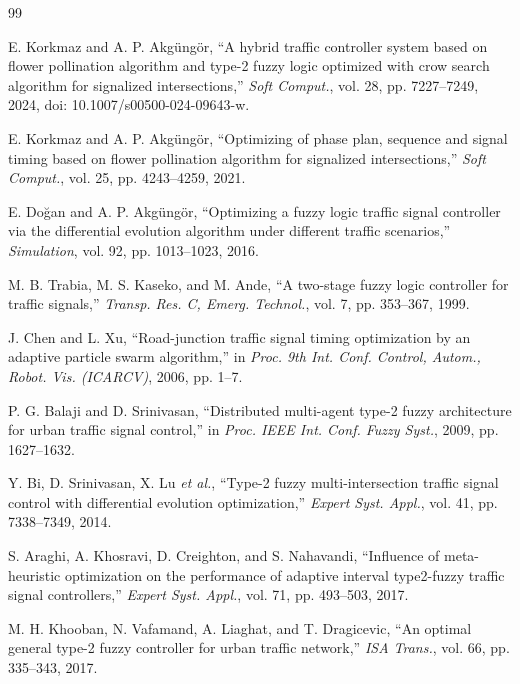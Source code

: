 \begin{thebibliography}{99}\small\raggedright\sloppy

 E. Korkmaz and A. P. Akg{\"u}ng{\"o}r, ``A hybrid traffic controller system based on flower pollination algorithm and type-2 fuzzy logic optimized with crow search algorithm for signalized intersections,'' \emph{Soft Comput.}, vol. 28, pp. 7227--7249, 2024, doi: 10.1007/s00500-024-09643-w.

 E. Korkmaz and A. P. Akg{\"u}ng{\"o}r, ``Optimizing of phase plan, sequence and signal timing based on flower pollination algorithm for signalized intersections,'' \emph{Soft Comput.}, vol. 25, pp. 4243--4259, 2021.

 E. Do{\u g}an and A. P. Akg{\"u}ng{\"o}r, ``Optimizing a fuzzy logic traffic signal controller via the differential evolution algorithm under different traffic scenarios,'' \emph{Simulation}, vol. 92, pp. 1013--1023, 2016.

 M. B. Trabia, M. S. Kaseko, and M. Ande, ``A two-stage fuzzy logic controller for traffic signals,'' \emph{Transp. Res. C, Emerg. Technol.}, vol. 7, pp. 353--367, 1999.

 J. Chen and L. Xu, ``Road-junction traffic signal timing optimization by an adaptive particle swarm algorithm,'' in \emph{Proc. 9th Int. Conf. Control, Autom., Robot. Vis. (ICARCV)}, 2006, pp. 1--7.

 P. G. Balaji and D. Srinivasan, ``Distributed multi-agent type-2 fuzzy architecture for urban traffic signal control,'' in \emph{Proc. IEEE Int. Conf. Fuzzy Syst.}, 2009, pp. 1627--1632.

 Y. Bi, D. Srinivasan, X. Lu \emph{et al.}, ``Type-2 fuzzy multi-intersection traffic signal control with differential evolution optimization,'' \emph{Expert Syst. Appl.}, vol. 41, pp. 7338--7349, 2014.

 S. Araghi, A. Khosravi, D. Creighton, and S. Nahavandi, ``Influence of meta-heuristic optimization on the performance of adaptive interval type2-fuzzy traffic signal controllers,'' \emph{Expert Syst. Appl.}, vol. 71, pp. 493--503, 2017.

 M. H. Khooban, N. Vafamand, A. Liaghat, and T. Dragicevic, ``An optimal general type-2 fuzzy controller for urban traffic network,'' \emph{ISA Trans.}, vol. 66, pp. 335--343, 2017.


\end{thebibliography}
